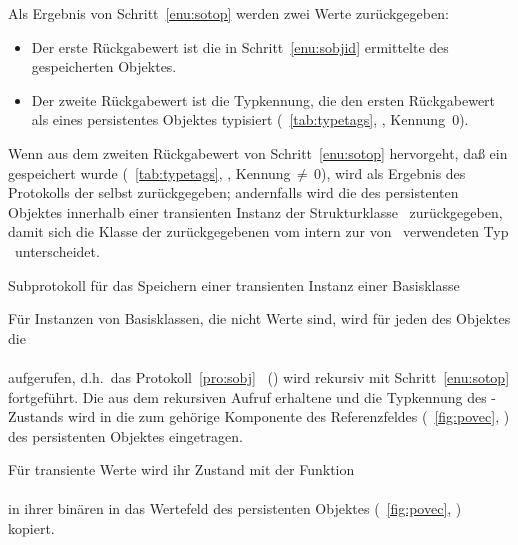 \begin{infol}
\begin{block}
%
\item Als Ergebnis von Schritt~\ref{enu:sotop} werden zwei Werte
zur\"{u}ckgegeben:
\begin{itemize}
%
\item Der erste R\"{u}ckgabewert ist die in Schritt~\ref{enu:sobjid}
ermittelte \sobjid\/ des gespeicherten Objektes.
%
\item Der zweite R\"{u}ckgabewert ist die Typkennung, die den ersten
R\"{u}ckgabewert als \sobjid\/ eines persistentes Objektes typisiert
(\tablename~\ref{tab:typetags}, \citepage{\pageref{tab:typetags}},
Kennung~0).
%
\end{itemize}%
%
\end{block}%
%
\item Wenn aus dem zweiten R\"{u}ckgabewert von Schritt~\ref{enu:sotop}
hervorgeht, da\ss{} ein \immval\/ gespeichert wurde
(\tablename~\ref{tab:typetags}, \citepage{\pageref{tab:typetags}},
Kennung\,$\neq$\,0), wird als Ergebnis des Protokolls der 
\immval\/ selbst zur\"{u}ckgegeben; andernfalls wird die \sobjid\/ des
persistenten Objektes innerhalb einer transienten Instanz der
Strukturklasse \ zur\"{u}ckgegeben, damit sich
die Klasse der zur\"{u}ckgegebenen \sobjid\/ vom intern zur
\representation{} von \sobjid[s]\ verwendeten Typ
\ unterscheidet.
%
\end{infol}%
%
\begin{infol}%
%
\acaption%
 {Subprotokoll f\"{u}r das Speichern einer transienten Instanz einer
  Basisklasse}%
 \label{pro:sbi}%
\nopagebreak[4]%
%
\item F\"{u}r Instanzen von Basisklassen, die nicht Werte sind, wird f\"{u}r
jeden \Slt\/ des Objektes die \gfn\\
\\
aufgerufen, d.h.\ das Protokoll~\ref{pro:sobj}
\ (\citepage{\pageref{pro:sobj}}) wird rekursiv
mit Schritt~\ref{enu:sotop} fortgef\"{u}hrt. Die aus dem rekursiven
Aufruf erhaltene \sobjid\/ und die Typkennung des \Slt\/-Zustands wird
in die zum \Slt\/ geh\"{o}rige Komponente des Referenzfeldes
(\figurename~\ref{fig:povec}, \citepage{\pageref{fig:povec}}) des
persistenten Objektes eingetragen.
%
\item F\"{u}r transiente Werte wird ihr Zustand mit der Funktion\\
\\
in ihrer bin\"{a}ren \representation{} in das Wertefeld des persistenten
Objektes (\figurename~\ref{fig:povec}, \citepage{\pageref{fig:povec}})
kopiert.
%
\end{infol}
